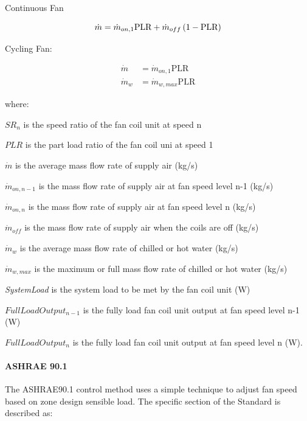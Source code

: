 Continuous Fan

\begin{equation}
  \dot{m} = \dot{m}_{on, 1} \text{PLR} + \dot{m}_{off} \PB{1 - \text{PLR}}
\end{equation}

Cycling Fan:

\begin{equation}
  \begin{array}{ll}
    \dot{m}   &= \dot{m}_{on, 1}\text{PLR} \\
    \dot{m}_w &= \dot{m}_{w, max} \text{PLR}
  \end{array}
\end{equation}

where:

$SR_n$ is the speed ratio of the fan coil unit at speed n

$PLR$ is the part load ratio of the fan coil uni at speed 1

$\dot{m}$ is the average mass flow rate of supply air (kg/s)

$\dot{m}_{on, n-1}$ is the mass flow rate of supply air at fan speed level n-1 (kg/s)

$\dot{m}_{on, n}$ is the mass flow rate of supply air at fan speed level n (kg/s)

$\dot{m}_{off}$ is the mass flow rate of supply air when the coils are off (kg/s)

$\dot{m}_{w}$ is the average mass flow rate of chilled or hot water (kg/s)

$\dot{m}_{w, max}$ is the maximum or full mass flow rate of chilled or hot water (kg/s)

\emph{SystemLoad} is the system load to be met by the fan coil unit (W)

$FullLoadOutput_{n-1}$ is the fully load fan coil unit output at fan speed level n-1 (W)

$FullLoadOutput_{n}$ is the fully load fan coil unit output at fan speed level n (W).

\paragraph{ASHRAE 90.1}\label{ashrae-90.1}

The ASHRAE90.1 control method uses a simple technique to adjust fan speed based on zone design sensible load. The specific section of the Standard is described as:

